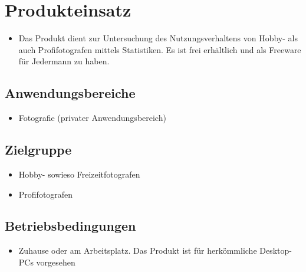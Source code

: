 \section{Produkteinsatz}
  \begin{itemize}
  \item Das Produkt dient zur Untersuchung des Nutzungsverhaltens von Hobby- als auch Profifotografen mittels Statistiken. Es ist frei erhältlich und als Freeware für Jedermann zu haben.
  \end{itemize}
\subsection{Anwendungsbereiche}
  \begin{itemize}
  \item Fotografie (privater Anwendungsbereich) 
  \end{itemize}

\subsection{Zielgruppe}
	\begin{itemize}
		\item Hobby- sowieso Freizeitfotografen
		\item Profifotografen		
	\end{itemize}

\subsection{Betriebsbedingungen}
  \begin{itemize}
  		\item Zuhause oder am Arbeitsplatz. Das Produkt ist für herkömmliche Desktop-PCs vorgesehen
  \end{itemize}
